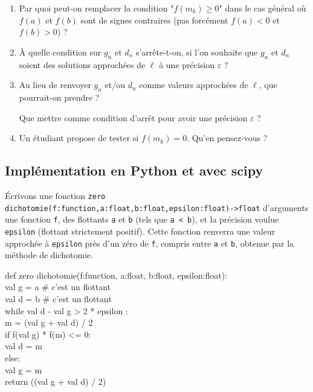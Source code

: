  \begin{enumerate}
 \item Par quoi peut-on remplacer la condition "$f(m_k)\geq 0$" dans le cas général où $f(a)$ et $f(b)$ sont de signes contraires (pas forcément $f(a)<0$ et $f(b)>0$) ?

 \item \`A quelle condition sur $g_n$ et $d_n$ s'arrête-t-on, si l'on souhaite que $g_n$ et $d_n$ soient des solutions approchées de $\ell$ à une précision $\varepsilon$ ?

 \item  Au lieu de renvoyer $g_n$ et/ou $d_n$ comme valeurs approchées de $\ell$, que pourrait-on prendre ? 
 
 Que mettre comme condition d'arrêt pour avoir une précision $\varepsilon$  ? 

 \item Un étudiant propose de tester si $f(m_k)=0$.  Qu'en pensez-vous ?

\end{enumerate}


\subsection{Implémentation en Python et avec scipy}
\'Ecrivons une fonction \texttt{zero dichotomie(f:function,a:float,b:float,epsilon:float)->float} d'arguments une fonction \texttt{f}, des flottants \texttt{a} et \texttt{b} (tels que \texttt{a < b}), et  la précision voulue \texttt{epsilon} (flottant strictement positif). Cette fonction renverra une valeur approchée à \texttt{epsilon} près d'un zéro de \texttt{f}, compris entre \texttt{a} et \texttt{b}, obtenue par la méthode de dichotomie.

\begin{python}
def zero dichotomie(f:function, a:float, b:float, epsilon:float):\\
     val g = a \# c'est un flottant\\
     val d = b \# c'est un flottant\\
     while val d - val g > 2 * epsilon :\\
          m = (val g + val d) / 2\\
          if f(val g) * f(m) <= 0:\\
               val d = m\\
          else:\\
               val g = m\\
     return ((val g + val d) / 2)
\end{python}

